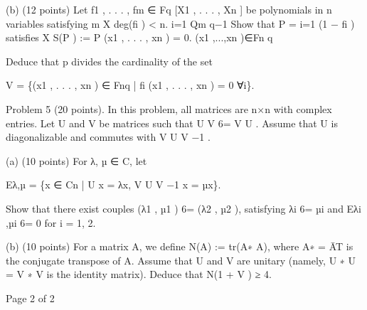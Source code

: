 \documentclass[UTF8,12pt]{ctexart}
\begin{document}
(b) (12 points) Let f1 , . . . , fm ∈ Fq [X1 , . . . , Xn ] be polynomials in n variables satisfying m X deg(fi ) < n. i=1 Qm q−1 Show that P = i=1 (1 − fi ) satisfies X S(P ) := P (x1 , . . . , xn ) = 0. (x1 ,...,xn )∈Fn q

Deduce that p divides the cardinality of the set

V = \{(x1 , . . . , xn ) ∈ Fnq | fi (x1 , . . . , xn ) = 0 ∀i\}.

Problem 5 (20 points). In this problem, all matrices are n×n with complex entries. Let U and V be matrices such that U V 6= V U . Assume that U is diagonalizable and commutes with V U V −1 .

(a) (10 points) For λ, µ ∈ C, let

Eλ,µ = \{x ∈ Cn | U x = λx, V U V −1 x = µx\}.

Show that there exist couples (λ1 , µ1 ) 6= (λ2 , µ2 ), satisfying λi 6= µi and Eλi ,µi 6= 0 for i = 1, 2.

(b) (10 points) For a matrix A, we define N(A) := tr(A∗ A), where A∗ = ĀT is the conjugate transpose of A. Assume that U and V are unitary (namely, U ∗ U = V ∗ V is the identity matrix). Deduce that N(1 + V ) ≥ 4.

Page 2 of 2
\end{document}
